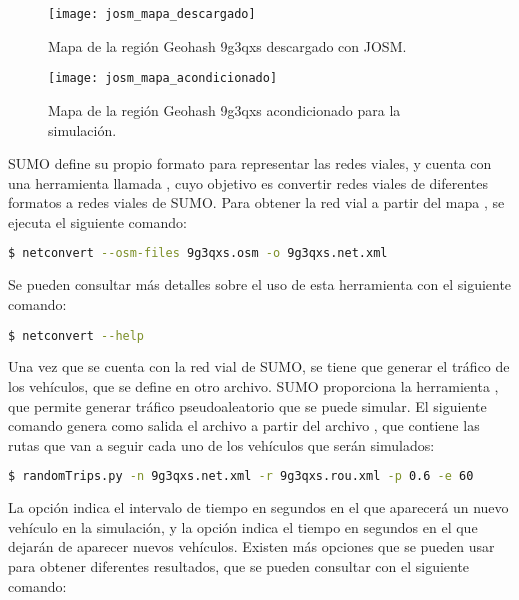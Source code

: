 \begin{figure}[th!]
\centering
\texttt{[image: josm\_mapa\_descargado]} 
\decoRule
\caption[Mapa de la región Geohash 9g3qxs descargado con JOSM]{Mapa de la
región Geohash 9g3qxs descargado con JOSM.}
\label{fig:josm_mapa_descargado}
\end{figure}

\begin{figure}[th!]
\centering
\texttt{[image: josm\_mapa\_acondicionado]}
\decoRule
\caption[Mapa de la región Geohash 9g3qxs acondicionado para la
simulación]{Mapa de la región Geohash 9g3qxs acondicionado para la simulación.}
\label{fig:josm_mapa_acondicionado}
\end{figure}

SUMO define su propio formato para representar las redes viales, y cuenta con
una herramienta llamada , cuyo objetivo es convertir redes
viales de diferentes formatos a redes viales de SUMO. Para obtener la red vial
 a partir del mapa , se ejecuta el
siguiente comando:

\begin{lstlisting}[language=bash]
$ netconvert --osm-files 9g3qxs.osm -o 9g3qxs.net.xml
\end{lstlisting}

Se pueden consultar más detalles sobre el uso de esta herramienta con el
siguiente comando:

\begin{lstlisting}[language=bash]
$ netconvert --help
\end{lstlisting}

Una vez que se cuenta con la red vial de SUMO, se tiene que generar el tráfico
de los vehículos, que se define en otro archivo. SUMO proporciona la
herramienta , que permite generar tráfico pseudoaleatorio
que se puede simular. El siguiente comando genera como salida el archivo
 a partir del archivo , que contiene
las rutas que van a seguir cada uno de los vehículos que serán simulados:

\begin{lstlisting}[language=bash]
$ randomTrips.py -n 9g3qxs.net.xml -r 9g3qxs.rou.xml -p 0.6 -e 60
\end{lstlisting}

La opción  indica el intervalo de tiempo en segundos en el que
aparecerá un nuevo vehículo en la simulación, y la opción  indica el
tiempo en segundos en el que dejarán de aparecer nuevos vehículos. Existen más
opciones que se pueden usar para obtener diferentes resultados, que se pueden
consultar con el siguiente comando:

